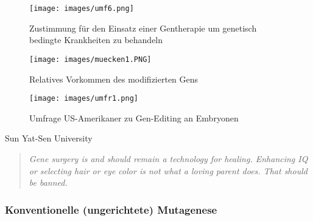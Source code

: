 \cite{XX}
\cite[57]{crispr1-4}


\begin{figure}[H]
    \centering
    \texttt{[image: images/umf6.png]}
    \caption{Zustimmung für den Einsatz einer Gentherapie um genetisch bedingte Krankheiten zu behandeln  \protect\cite{china} }
    \label{fig:china1}
    \end{figure}


\begin{figure}[H]
    \centering
    \texttt{[image: images/muecken1.PNG]}
    \caption{ Relatives Vorkommen des modifizierten Gens\protect\cite{mueckenArtikel}}
        \label{fig:muecken1}
\end{figure}

    \begin{wrapfigure}{R}{0.55\textwidth}
\centering
\texttt{[image: images/umfr1.png]}
\caption{{Umfrage US-Amerikaner zu Gen-Editing an Embryonen \protect\cite{usa}}}
  \label{fig:amazon_result}
\end{wrapfigure}


\glqq Sun Yat-Sen University\grqq{}


\begin{quote}
    \textit{Gene surgery is and should remain a technology for healing. Enhancing IQ or selecting hair or eye color is not what a loving parent does. That should be banned.} \cite{yt}
     \end{quote}


\subsubsection*{Konventionelle (ungerichtete) Mutagenese}